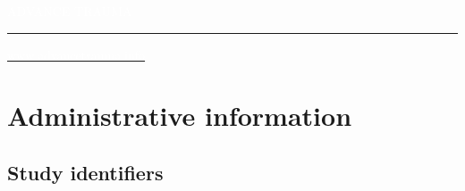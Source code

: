 \documentclass[
]{scrartcl}
\newcommand{\titlepageurl}{\href{https://www.advancetrauma.info}{\textcolor{white}{www.advancetrauma.info}}}
\newcommand{\advancetraumabrand}{%
  {\quicksand\fontsize{32}{40}\selectfont\textcolor{white}{ADVANCE TRAUMA}}\par
  \vspace{1.5em}%
}
\renewcommand*\contentsname{Table of contents}
\newcommand\contentsname{Table of contents}
\begin{document}
\begin{titlepage}
\newcommand{\logoblock}{}

\newcommand{\footerblock}{\textcolor{white}{\titlepagefooterfont
\titlepagefooterblock}

\vspace{0pt}
}

\newcommand{\dateblock}{}

\newcommand{\headerblock}{}
\pagecolor{pgcolor}\afterpage{\nopagecolor}

\thispagestyle{empty} %


\newlength{\minipagewidth}
\setlength{\minipagewidth}{\textwidth}
\raggedright %
\begin{minipage}[b][\textheight][s]{\minipagewidth}
\titlepagepagealign
\advancetraumabrand

\titleblock

\vfill

\footerblock

\textcolor{white}{\hrule}

\par

\vspace*{0.5cm}

\bgroup\LARGE\sffamily\titlepageurl\egroup
\par

\end{minipage}
\clearpage
\end{titlepage}
\setcounter{page}{1}


\renewcommand*\contentsname{Table of contents}
{
\hypersetup{linkcolor=}
\setcounter{tocdepth}{4}
\tableofcontents
}

\newpage{}

\section{Administrative
information}\label{sec-administrative-information}

\subsection{Study identifiers}\label{sec-study-identifiers}
\end{document}
